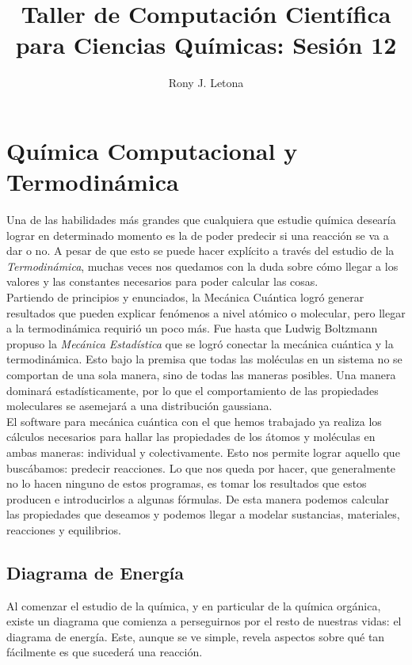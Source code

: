 \documentclass[10pt,letterpaper]{article}
\author{Rony J. Letona}
\title{Taller de Computaci\'on Cient\'ifica para Ciencias Qu\'imicas: Sesi\'on 12}
\begin{document}
\maketitle

\section{Qu\'imica Computacional y Termodin\'amica}
Una de las habilidades m\'as grandes que cualquiera que estudie qu\'imica desear\'ia lograr en determinado momento es la de poder predecir si una reacci\'on se va a dar o no. A pesar de que esto se puede hacer expl\'icito a trav\'es del estudio de la \emph{Termodin\'amica}, muchas veces nos quedamos con la duda sobre c\'omo llegar a los valores y las constantes necesarios para poder calcular las cosas.\\

Partiendo de principios y enunciados, la Mec\'anica Cu\'antica logr\'o generar resultados que pueden explicar fen\'omenos a nivel at\'omico o molecular, pero llegar a la termodin\'amica requiri\'o un poco m\'as. Fue hasta que Ludwig Boltzmann propuso la \emph{Mec\'anica Estad\'istica} que se logr\'o conectar la mec\'anica cu\'antica y la termodin\'amica. Esto bajo la premisa que todas las mol\'eculas en un sistema no se comportan de una sola manera, sino de todas las maneras posibles. Una manera dominar\'a estad\'isticamente, por lo que el comportamiento de las propiedades moleculares se asemejar\'a a una distribuci\'on gaussiana.\\

El software para mec\'anica cu\'antica con el que hemos trabajado ya realiza los c\'alculos necesarios para hallar las propiedades de los \'atomos y mol\'eculas en ambas maneras: individual y colectivamente. Esto nos permite lograr aquello que busc\'abamos: predecir reacciones. Lo que nos queda por hacer, que generalmente no lo hacen ninguno de estos programas, es tomar los resultados que estos producen e introducirlos a algunas f\'ormulas. De esta manera podemos calcular las propiedades que deseamos y podemos llegar a modelar sustancias, materiales, reacciones y equilibrios.

\subsection{Diagrama de Energ\'ia}

Al comenzar el estudio de la qu\'imica, y en particular de la qu\'imica org\'anica, existe un diagrama que comienza a perseguirnos por el resto de nuestras vidas: el diagrama de energ\'ia. Este, aunque se ve simple, revela aspectos sobre qu\'e tan f\'acilmente es que suceder\'a una reacci\'on.
\end{document}
